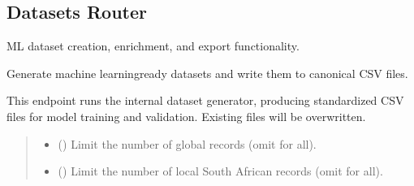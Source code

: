 \documentclass[letterpaper,10pt,english]{sphinxmanual}
\begin{document}
\subsection{Datasets Router}
\label{\detokenize{api_reference:datasets-router}}
\sphinxAtStartPar
ML dataset creation, enrichment, and export functionality.
\label{\detokenize{api_reference:module-app.routers.datasets}}

\begin{fulllineitems}
\label{\detokenize{api_reference:app.routers.datasets.generate_ml_ready_files}}
\pysigstartsignatures
\pysiglinewithargsret
{}
{\sphinxparamcomma {}\sphinxparamcomma {}\sphinxparamcomma {}}
{}
\pysigstopsignatures
\sphinxAtStartPar
Generate machine learning\sphinxhyphen{}ready datasets and write them to canonical CSV files.

\sphinxAtStartPar
This endpoint runs the internal dataset generator, producing standardized CSV files for model training and validation. Existing files will be overwritten.
\begin{quote}\begin{description}
\begin{itemize}
\item {} 
\sphinxAtStartPar
{} (\sphinxstyleliteralemphasis{\sphinxupquote{{[}}}\sphinxstyleliteralemphasis{\sphinxupquote{{]}}}) \textendash{} Limit the number of global records (omit for all).

\item {} 
\sphinxAtStartPar
{} (\sphinxstyleliteralemphasis{\sphinxupquote{{[}}}\sphinxstyleliteralemphasis{\sphinxupquote{{]}}}) \textendash{} Limit the number of local South African records (omit for all).


\end{itemize}
\end{description}
\end{quote}
\end{fulllineitems}
\end{document}

